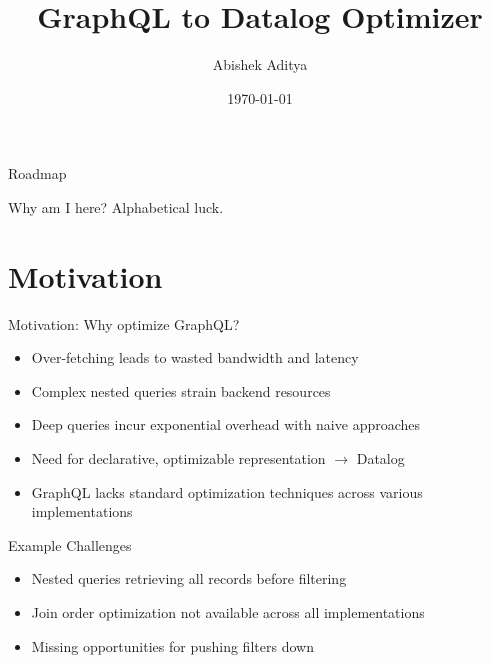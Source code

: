 \documentclass{beamer}
\title{GraphQL to Datalog Optimizer}
\author{Abishek Aditya}
\institute{CSE505 Spring 2025}
\date{\today}
\begin{document}
\maketitle

\begin{frame}{Roadmap}
  \tableofcontents[hideallsubsections]
\end{frame}

\begin{frame}{Why am I here?}
        Alphabetical luck.
\end{frame}

\section{Motivation}
\begin{frame}{Motivation: Why optimize GraphQL?}
  \begin{itemize}
    \item Over-fetching leads to wasted bandwidth and latency
    \item Complex nested queries strain backend resources
    \item Deep queries incur exponential overhead with naive approaches
    \item Need for declarative, optimizable representation $\rightarrow$ \alert{Datalog}
    \item GraphQL lacks standard optimization techniques across various implementations
  \end{itemize}
  
  \begin{block}{Example Challenges}
    \begin{itemize}
      \item Nested queries retrieving all records before filtering
      \item Join order optimization not available across all implementations
      \item Missing opportunities for pushing filters down
    \end{itemize}
  \end{block}
\end{frame}

\end{document}

